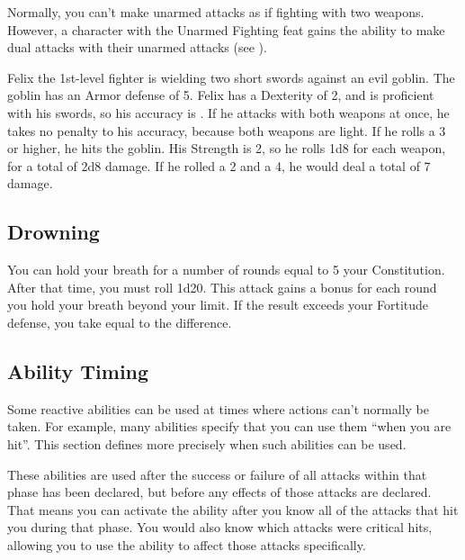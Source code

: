          Normally, you can't make unarmed attacks as if fighting with two weapons. However, a character with the Unarmed Fighting feat gains the ability to make dual attacks with their unarmed attacks (see ).

         Felix the 1st-level fighter is wielding two short swords against an evil goblin.
        The goblin has an Armor defense of 5.
        Felix has a Dexterity of 2, and is proficient with his swords, so his accuracy is .
        If he attacks with both weapons at once, he takes no penalty to his accuracy, because both weapons are light.
        If he rolls a 3 or higher, he hits the goblin.
        His Strength is 2, so he rolls 1d8 for each weapon, for a total of 2d8 damage.
        If he rolled a 2 and a 4, he would deal a total of 7 damage.

    \subsection{Drowning}\label{Drowning}
        You can hold your breath for a number of rounds equal to 5 \add your Constitution.
        After that time, you must roll 1d20.
        This attack gains a  bonus for each round you hold your breath beyond your limit.
        If the result exceeds your Fortitude defense, you take  equal to the difference.

    \subsection{Ability Timing}
        Some reactive abilities can be used at times where actions can't normally be taken.
        For example, many abilities specify that you can use them ``when you are hit''.
        This section defines more precisely when such abilities can be used.

         These abilities are used after the success or failure of all attacks within that phase has been declared, but before any effects of those attacks are declared.
        That means you can activate the ability after you know all of the attacks that hit you during that phase.
        You would also know which attacks were critical hits, allowing you to use the ability to affect those attacks specifically.
